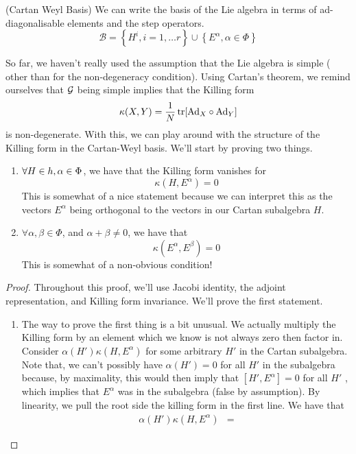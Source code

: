   \begin{defn}{(Cartan Weyl Basis)}
  	We can write the basis of the Lie algebra in terms
	of ad-diagonalisable elements and the step operators. 
	\[
	 \mathcal{ B } = \left\{  H ^ i , i = 1, \dots r   \right\} \cup 
	 \left\{  E ^ \alpha , \alpha \in \Phi  \right\} 
	\]  
  \end{defn}
 So far, we haven't really used the assumption that the Lie algebra is simple ( 
 other than for the non-degeneracy condition). 
Using Cartan's theorem, we remind ourselves 
that $ \mathcal{ G } $ being simple implies that the Killing form 
\[
	\kappa ( X, Y ) = \frac{1}{N } \tr [ \text{Ad} _ X \circ \text{Ad}_ Y ] 
\] is non-degenerate. 
With this, we can play around with the structure 
of the Killing form in the Cartan-Weyl basis. 
We'll start by proving two things.
\begin{thm}
	\begin{enumerate}
		\item $ \forall H \in h , \alpha \in \Phi $, we have 
			that the Killing form vanishes for 
			\[
			 \kappa ( H , E ^ \alpha ) = 0 
			\] This is somewhat 
			of a nice statement because we can interpret this 
			as the vectors $ E ^{ \alpha } $ being 
			orthogonal to the vectors in our Cartan subalgebra $ H$. 
		\item $ \forall \alpha, \beta \in \Phi $, and $ \alpha + \beta \neq 0 $, 
			we have that 
			\[
			 \kappa ( E ^ \alpha, E ^ \beta ) = 0 
			\] This is somewhat of a non-obvious condition! 
	\end{enumerate}
\begin{proof}
Throughout this proof, we'll use 
Jacobi identity, the adjoint representation, and Killing form 
invariance. 
We'll prove the first statement. 
\begin{enumerate}
	\item The way to prove the first thing is 
		a bit unusual. We actually multiply 
		the Killing form by an element which 
		we know is not always zero then 
		factor in. Consider $ \alpha ( H ' ) \kappa ( H , E ^ \alpha )$ for some 
		arbitrary $ H ' $ in the Cartan subalgebra. Note that, 
		we can't possibly have $ \alpha ( H ' )  =0 $ for 
		all  $ H' $ in the subalgebra because, by maximality, 
		this would then imply that $ [ H' , E ^ \alpha ]  = 0 $ 
		for all $ H'  $ , which implies that $ E ^ \alpha $ was 
		in the subalgebra (false by assumption). 
		By linearity, we pull the root side the killing form 
		in the first line. We have that 
		 \begin{align*}
			 \alpha ( H ' ) \kappa ( H , E ^ \alpha ) &=  

\end{align*}
\end{enumerate}
\end{proof}
\end{thm}
